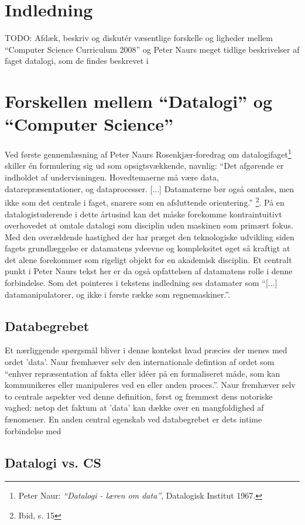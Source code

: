 \documentclass[10pt,a4paper]{article}
\begin{document}
\section{Indledning}

TODO: Afdæk, beskriv og diskutér væsentlige forskelle og ligheder mellem
“Computer Science Curriculum 2008” og Peter Naurs meget tidlige beskrivelser af
faget datalogi, som de findes beskrevet i


\section{Forskellen mellem ``Datalogi'' og ``Computer Science''}
Ved første gennemlæsning af Peter Naurs Rosenkjær-foredrag om 
datalogifaget\footnote{Peter Naur: \emph{``Datalogi - læren om data''}, Datalogisk
Institut 1967.} skiller én formulering sig ud som opsigtsvækkende, navnlig: 
``Det afgørende er indholdet af undervisningen. Hovedtemaerne må være data, 
datarepræsentationer, og dataprocesser. [...] Datamaterne bør også omtales, men
ikke som det centrale i faget, snarere som en afsluttende orientering.''
\footnote{Ibid, s. 15}. På en datalogistuderende i dette årtusind kan det 
måske forekomme kontraintuitivt overhovedet at omtale datalogi som disciplin
uden maskinen som primært fokus. Med den overældende hastighed der har præget
den teknologiske udvikling siden fagets grundlæggelse er datamatens ydeevne og 
kompleksitet øget så kraftigt at det alene forekommer som rigeligt objekt for 
en akademisk disciplin. Et centralt punkt i Peter Naurs tekst her er da også 
opfattelsen af datamatens rolle i denne forbindelse. Som det pointeres i tekstens 
indledning ses datamater som ``[...] datamanipulatorer, og ikke i første række
som regnemaskiner.''. 
\subsection{Databegrebet}
Et nærliggende spørgsmål bliver i denne kontekst hvad præcies der menes med
ordet 'data'. Naur fremhæver selv den internationale defintion af ordet som 
``enhver repræsentation af fakta eller idéer på en formaliseret måde, som kan 
kommunikeres eller manipuleres ved en eller anden proces.''. Naur fremhæver selv 
to centrale aspekter ved denne definition, først og fremmest dens notoriske vaghed: 
netop det faktum at 'data' kan dække over en mangfoldighed af fænomener. En anden
central egenskab ved databegrebet er dets intime forbindelse med 

\subsection{Datalogi vs. CS}
\end{document}
